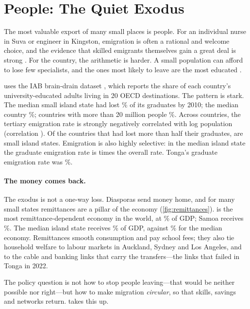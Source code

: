 \section{People: The Quiet Exodus}
\label{sec:people}

The most valuable export of many small places is people. For an individual
nurse in Suva or engineer in Kingston, emigration is often a rational and
welcome choice, and the evidence that skilled emigrants themselves gain a
great deal is strong \parencite{gibson2012}. For the country, the arithmetic
is harder. A small population can afford to lose few specialists, and the
ones most likely to leave are the most educated
\parencite{docquier2012,gibson2011}.



 uses the IAB brain-drain dataset
\parencite{brucker2013}, which reports the share of each country's
university-educated adults living in 20 OECD destinations. The pattern is
stark. The median small island state had lost \emigSIDSMedian\% of its
graduates by 2010; the median country \emigAllMedian\%; countries with more
than 20 million people \emigLargeMedian\%. Across countries, the
tertiary emigration rate is strongly negatively correlated with log population
(correlation \corrEmigPop). Of the \nEmigOverHalf{} countries that had lost more than
half their graduates, \nEmigOverHalfSIDS{} are small island states. Emigration
is also highly selective: in the median island state the graduate emigration
rate is \emigSelectivity{} times the overall rate. Tonga's graduate emigration
rate was \emigTonga\%.

\paragraph{The money comes back.} The exodus is not a one-way loss. Diasporas
send money home, and for many small states remittances are a pillar of the
economy (\cref{fig:remittances}). \remitTopName{} is the most
remittance-dependent economy in the world, at \remitTopValue\% of GDP;
Samoa receives \remitSamoa\%. The median island state receives
\remitSIDSMedian\% of GDP, against \remitWorldMedian\% for the median
economy. Remittances smooth consumption and pay school fees; they also tie
household welfare to labour markets in Auckland, Sydney and Los Angeles, and
to the cable and banking links that carry the transfers---the links that
failed in Tonga in 2022.



The policy question is not how to stop people leaving---that would be
neither possible nor right---but how to make migration \emph{circular}, so
that skills, savings and networks return.  takes this up.
